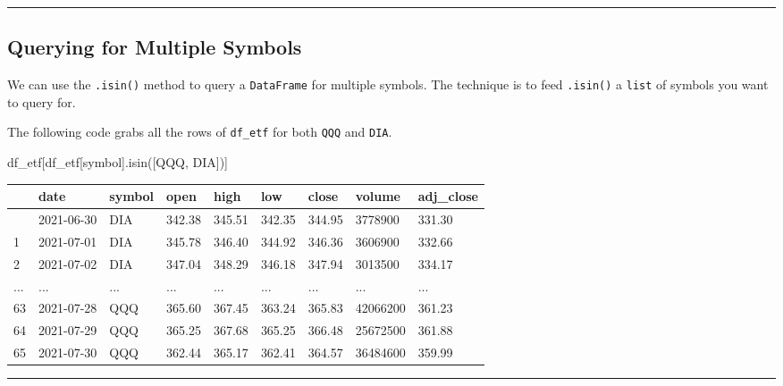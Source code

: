 \documentclass[
  letterpaper,
  DIV=11,
  numbers=noendperiod]{scrreprt}
\newenvironment{Shaded}{\begin{snugshade}}{\end{snugshade}}
\newcommand{\NormalTok}[1]{\textcolor[rgb]{0.00,0.23,0.31}{#1}}
\newcommand{\StringTok}[1]{\textcolor[rgb]{0.13,0.47,0.30}{#1}}
\begin{document}
\begin{center}\rule{0.5\linewidth}{0.5pt}\end{center}

\hypertarget{querying-for-multiple-symbols}{%
\subsection{Querying for Multiple
Symbols}\label{querying-for-multiple-symbols}}

We can use the \texttt{.isin()} method to query a \texttt{DataFrame} for
multiple symbols. The technique is to feed \texttt{.isin()} a
\texttt{list} of symbols you want to query for.

The following code grabs all the rows of \texttt{df\_etf} for both
\texttt{QQQ} and \texttt{DIA}.

\begin{Shaded}
\begin{Highlighting}[]
\NormalTok{df\_etf[df\_etf[}\StringTok{\textquotesingle{}symbol\textquotesingle{}}\NormalTok{].isin([}\StringTok{\textquotesingle{}QQQ\textquotesingle{}}\NormalTok{, }\StringTok{\textquotesingle{}DIA\textquotesingle{}}\NormalTok{])]}
\end{Highlighting}
\end{Shaded}

\begin{longtable}[]{@{}lllllllll@{}}
\toprule\noalign{}
& date & symbol & open & high & low & close & volume & adj\_close \\
\midrule\noalign{}
\endhead
\bottomrule\noalign{}
\endlastfoot
0 & 2021-06-30 & DIA & 342.38 & 345.51 & 342.35 & 344.95 & 3778900 &
331.30 \\
1 & 2021-07-01 & DIA & 345.78 & 346.40 & 344.92 & 346.36 & 3606900 &
332.66 \\
2 & 2021-07-02 & DIA & 347.04 & 348.29 & 346.18 & 347.94 & 3013500 &
334.17 \\
... & ... & ... & ... & ... & ... & ... & ... & ... \\
63 & 2021-07-28 & QQQ & 365.60 & 367.45 & 363.24 & 365.83 & 42066200 &
361.23 \\
64 & 2021-07-29 & QQQ & 365.25 & 367.68 & 365.25 & 366.48 & 25672500 &
361.88 \\
65 & 2021-07-30 & QQQ & 362.44 & 365.17 & 362.41 & 364.57 & 36484600 &
359.99 \\
\end{longtable}

\begin{center}\rule{0.5\linewidth}{0.5pt}\end{center}
\end{document}

